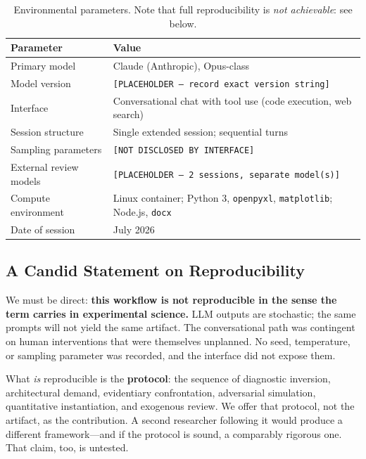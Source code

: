 \documentclass[11pt,a4paper]{article}
\begin{document}
\begin{table}[h!]
\centering
\small
\begin{tabular}{@{}ll@{}}
\toprule
\textbf{Parameter} & \textbf{Value} \\
\midrule
Primary model & Claude (Anthropic), Opus-class \\
Model version & \texttt{[PLACEHOLDER --- record exact version string]} \\
Interface & Conversational chat with tool use (code execution, web search) \\
Session structure & Single extended session; sequential turns \\
Sampling parameters & \texttt{[NOT DISCLOSED BY INTERFACE]} \\
External review models & \texttt{[PLACEHOLDER --- 2 sessions, separate model(s)]} \\
Compute environment & Linux container; Python 3, \texttt{openpyxl}, \texttt{matplotlib}; Node.js, \texttt{docx} \\
Date of session & July 2026 \\
\bottomrule
\end{tabular}
\caption{Environmental parameters. Note that full reproducibility is \emph{not achievable}: see below.}
\end{table}

\subsection{A Candid Statement on Reproducibility}

We must be direct: \textbf{this workflow is not reproducible in the sense the term carries in experimental science.} LLM outputs are stochastic; the same prompts will not yield the same artifact. The conversational path was contingent on human interventions that were themselves unplanned. No seed, temperature, or sampling parameter was recorded, and the interface did not expose them.

What \emph{is} reproducible is the \textbf{protocol}: the sequence of diagnostic inversion, architectural demand, evidentiary confrontation, adversarial simulation, quantitative instantiation, and exogenous review. We offer that protocol, not the artifact, as the contribution. A second researcher following it would produce a different framework---and if the protocol is sound, a comparably rigorous one. That claim, too, is untested.

\end{document}
